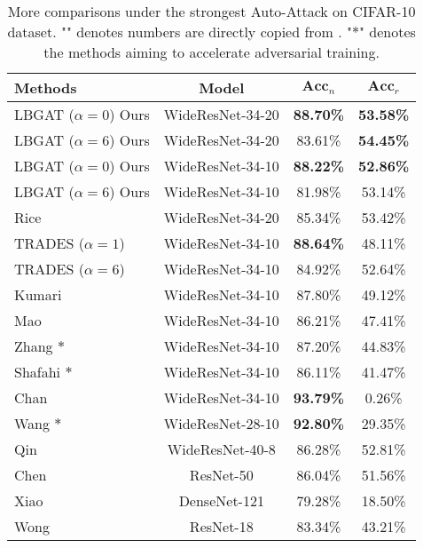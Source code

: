 \documentclass[10pt,twocolumn,letterpaper]{article}
\begin{document}
\begin{table*}[h]
	\centering
	\caption{More comparisons under the strongest Auto-Attack on CIFAR-10 dataset.  "\dag" denotes numbers are directly copied from \cite{croce2020reliable}. "$\ast$" denotes the methods aiming to accelerate adversarial training.} 
	\vspace{0.1cm}
	\begin{tabular}{l|c|c|c}
		\textbf{Methods} & Model &$\textbf{Acc}_{n}$ &$\textbf{Acc}_{r}$ \\
		\hline
		\hline
		LBGAT ($\alpha=0$) Ours                 &WideResNet-34-20 &\textbf{88.70\%} &\textbf{53.58\%} \\
		LBGAT ($\alpha=6$) Ours                 &WideResNet-34-20 &83.61\% &\textbf{54.45\%} \\
		LBGAT ($\alpha=0$) Ours                 &WideResNet-34-10 &\textbf{88.22\%} &\textbf{52.86\%} \\
		LBGAT ($\alpha=6$) Ours                 &WideResNet-34-10 &81.98\% &53.14\% \\
		\hline
		\hline
		Rice \etal \cite{rice2020overfitting} \dag    &WideResNet-34-20 &85.34\%	&53.42\% \\
		TRADES ($\alpha=1$)                            &WideResNet-34-10 &\textbf{88.64\%} &48.11\%\\
		TRADES ($\alpha=6$)                            &WideResNet-34-10 &84.92\%    &52.64\% \\ 
		Kumari \etal \cite{kumari2019harnessing} \dag &WideResNet-34-10 &87.80\%	&49.12\% \\
		Mao \etal \cite{mao2019metric} \dag           &WideResNet-34-10 &86.21\%	&47.41\% \\
		Zhang \etal \cite{zhang2019you} \dag $\ast$   &WideResNet-34-10 &87.20\%	&44.83\% \\
		Shafahi \etal \cite{shafahi2019adversarial} \dag $\ast$ &WideResNet-34-10   &86.11\% &41.47\% \\
		Chan \etal \cite{chan2019jacobian} \dag                 &WideResNet-34-10 &\textbf{93.79\%} &0.26\% \\
		Wang \etal \cite{wang2019bilateral} \dag $\ast$         &WideResNet-28-10 &\textbf{92.80\%} &29.35\% \\
		Qin \etal \cite{qin2019adversarial} \dag         &WideResNet-40-8  &86.28\% &52.81\% \\
		Chen \etal \cite{chen2020adversarial} \dag       &ResNet-50        &86.04\% &51.56\% \\
		Xiao \etal \cite{xiao2019enhancing} \dag         &DenseNet-121     &79.28\% &18.50\% \\
		Wong \etal \cite{wong2020fast} \dag              &ResNet-18        &83.34\% &43.21\% \\
		\hline
		\hline
	\end{tabular}
	\label{tab:more_aa_cifar10}
\end{table*}
\newpage
\end{document}
